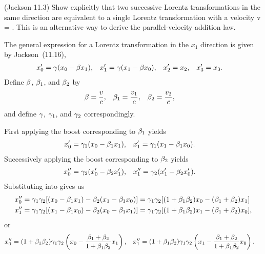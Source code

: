 \newcommand{\vq}{v_1}
\newcommand{\vw}{v_2}

\begin{statement}{(Jackson 11.3)}
	Show explicitly that two successive Lorentz transformations in the same direction are equivalent to a single Lorentz transformation with a velocity
	\beq
		v = \frac{\vq + \vw}{1 + \vq \vw / c^2}.
	\eeq
	This is an alternative way to derive the parallel-velocity addition law.
\end{statement}

\newcommand{\xo}{x_0}
\newcommand{\xq}{x_1}
\newcommand{\xw}{x_2}
\newcommand{\xe}{x_3}

\newcommand{\betq}{\bet_1}
\newcommand{\betw}{\bet_2}
\newcommand{\gamq}{\gam_1}
\newcommand{\gamw}{\gam_2}

\begin{solution}
	The general expression for a Lorentz transformation in the $\xq$ direction is given by Jackson~(11.16),
	\begin{align} \label{lorentz}
		\xo' &= \gam (\xo - \bet \xq), &
		\xq' &= \gam (\xq - \bet \xo), &
		\xw' &= \xw, &
		\xe' &= \xe.
	\end{align}
	Define $\beta$, $\betq$, and $\betw$ by
	\begin{align*}
		\bet &= \frac{v}{c}, &
		\betq &= \frac{\vq}{c}, &
		\betw &= \frac{\vw}{c},
	\end{align*}
	and define $\gamma$, $\gamq$, and $\gamw$ correspondingly.
	
	First applying the boost corresponding to $\betq$ yields
	\begin{align} \label{boost1}
		\xo' &= \gamq (\xo - \betq \xq), &
		\xq' &= \gamq (\xq - \betq \xo).
	\end{align}
	Successively applying the boost corresponding to $\betw$ yields
	\begin{align} \label{boost2}
		\xo'' &= \gamw (\xo' - \betw \xq'), &
		\xq'' &= \gamw (\xq' - \betw \xo').
	\end{align}
	Substituting  into  gives us
	\begin{align*}
		\xo'' &= \gamq \gamw [(\xo - \betq \xq) - \betw (\xq - \betq \xo)]
		= \gamq \gamw [(1 + \betq \betw) \xo - (\betq + \betw) \xq] \\
		\xq'' &= \gamq \gamw [(\xq - \betq \xo) - \betw (\xo - \betq \xq)]
		= \gamq \gamw [(1 + \betq \betw) \xq - (\betq + \betw) \xo],
	\end{align*}
	or
	\begin{align} \label{thing1}
		\xo'' &= (1 + \betq \betw) \gamq \gamw \left( \xo - \frac{\betq + \betw}{1 + \betq \betw} \xq \right), &
		\xq'' &= (1 + \betq \betw) \gamq \gamw \left( \xq - \frac{\betq + \betw}{1 + \betq \betw} \xo \right).
	\end{align}
	

\end{solution}
